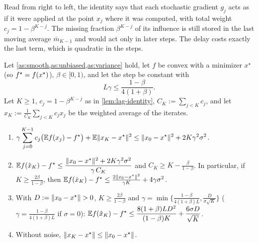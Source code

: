 Read from right to left, the identity says that each stochastic gradient $g_j$ acts as
if it were applied at the point $x_j$ where it was computed, with total weight
$c_j=1-\beta^{K-j}$. The missing fraction $\beta^{K-j}$ of its influence is still stored in
the last moving average $\bar m_{K-1}$ and would act only in later steps. The delay costs
exactly the last term, which is quadratic in the steps.

\begin{tcolorbox}[keybox]
\begin{theorem}\label{thm:lf-convex}
Let \cref{as:smooth,as:unbiased,as:variance} hold, let $f$ be convex with a minimizer
$x^\star$ (so $f^\star=f(x^\star)$), $\beta\in[0,1)$, and let the step be constant with
\[
  L\gamma\le\frac{1-\beta}{4(1+\beta)} .
\]
Let $K\ge1$, $c_j=1-\beta^{K-j}$ as in \cref{lem:lag-identity}, $C_K:=\sum_{j<K}c_j$, and let
$\hat x_K:=\frac1{C_K}\sum_{j<K}c_jx_j$ be the weighted average of the iterates.
\begin{enumerate}[label=\textup{(\alph*)}]
\item $\displaystyle\gamma\sum_{j=0}^{K-1}c_j\bigl(\mathbb{E} f(x_j)-f^\star\bigr)+\mathbb{E}\lVert x_K-x^\star\rVert^2\le\lVert x_0-x^\star\rVert^2+2K\gamma^2\sigma^2$.
\item $\displaystyle\mathbb{E} f(\hat x_K)-f^\star\le\frac{\lVert x_0-x^\star\rVert^2+2K\gamma^2\sigma^2}{\gamma\,C_K}$ and
  $C_K\ge K-\frac{\beta}{1-\beta}$. In particular, if $K\ge\frac{2\beta}{1-\beta}$, then
  $\mathbb{E} f(\hat x_K)-f^\star\le\frac{2\lVert x_0-x^\star\rVert^2}{\gamma K}+4\gamma\sigma^2$.
\item With $D:=\lVert x_0-x^\star\rVert>0$, $K\ge\frac{2\beta}{1-\beta}$ and
  $\gamma=\min\bigl\{\frac{1-\beta}{4(1+\beta)L},\frac{D}{\sigma\sqrt K}\bigr\}$
  ($\gamma=\frac{1-\beta}{4(1+\beta)L}$ if $\sigma=0$):
  $\displaystyle\mathbb{E} f(\hat x_K)-f^\star\le\frac{8(1+\beta)LD^2}{(1-\beta)K}+\frac{6\sigma D}{\sqrt K}$.
\item Without noise, $\lVert x_K-x^\star\rVert\le\lVert x_0-x^\star\rVert$.
\end{enumerate}
\end{theorem}
\end{tcolorbox}

